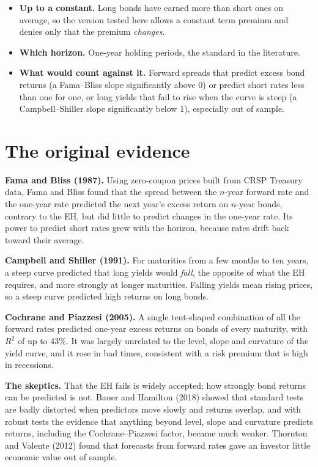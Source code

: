 \begin{itemize}
  \item \textbf{Up to a constant.} Long bonds have earned more than short ones on average, so the version tested here allows a constant term premium and denies only that the premium \emph{changes}.
  \item \textbf{Which horizon.} One-year holding periods, the standard in the literature.
  \item \textbf{What would count against it.} Forward spreads that predict excess bond returns (a Fama--Bliss slope significantly above 0) or predict short rates less than one for one, or long yields that fail to rise when the curve is steep (a Campbell--Shiller slope significantly below 1), especially out of sample.
\end{itemize}

\section{The original evidence}
\label{sec:07-evidence}

\textbf{Fama and Bliss (1987).} Using zero-coupon prices built from CRSP Treasury data, Fama and Bliss found that the spread between the $n$-year forward rate and the one-year rate predicted the next year's excess return on $n$-year bonds, contrary to the EH, but did little to predict changes in the one-year rate. Its power to predict short rates grew with the horizon, because rates drift back toward their average.

\textbf{Campbell and Shiller (1991).} For maturities from a few months to ten years, a steep curve predicted that long yields would \emph{fall}, the opposite of what the EH requires, and more strongly at longer maturities. Falling yields mean rising prices, so a steep curve predicted high returns on long bonds.

\textbf{Cochrane and Piazzesi (2005).} A single tent-shaped combination of all the forward rates predicted one-year excess returns on bonds of every maturity, with $R^2$ of up to 43\%. It was largely unrelated to the level, slope and curvature of the yield curve, and it rose in bad times, consistent with a risk premium that is high in recessions.

\textbf{The skeptics.} That the EH fails is widely accepted; how strongly bond returns can be predicted is not. Bauer and Hamilton (2018) showed that standard tests are badly distorted when predictors move slowly and returns overlap, and with robust tests the evidence that anything beyond level, slope and curvature predicts returns, including the Cochrane--Piazzesi factor, became much weaker. Thornton and Valente (2012) found that forecasts from forward rates gave an investor little economic value out of sample.

